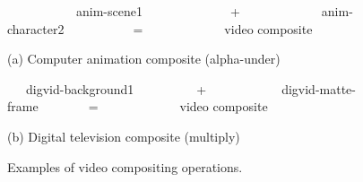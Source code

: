 \begin{figure}[t]
\centering
\begin{minipage}{0.3\textwidth}
\centering
{}
\vspace{2pt}
\end{minipage}
\begin{minipage}{0.3\textwidth}
\centering
{}
\vspace{2pt}
\end{minipage}
\begin{minipage}{0.3\textwidth}
\centering
{}
\vspace{2pt}
\end{minipage}

{\small ~~~~~~~~~~~anim-scene1~~~~~~~~~~~~~~+~~~~~~~~~~~~~anim-character2~~~~~~~~~~~=~~~~~~~~~~~~~video composite~~~~~~~}

\begin{center}
\vspace{-3pt}
(a) Computer animation composite (alpha-under)
\end{center} \vspace{12pt}

\begin{minipage}{0.3\textwidth}
\centering
{}
\vspace{2pt}
\end{minipage}
\begin{minipage}{0.3\textwidth}
\centering
{}
\vspace{2pt}
\end{minipage}
\begin{minipage}{0.3\textwidth}
\centering
{}
\vspace{2pt}
\end{minipage}

{\small ~~~digvid-background1~~~~~~~~~~+~~~~~~~~~~~~digvid-matte-frame~~~~~~~~=~~~~~~~~~~~~~video composite~~~~~~~}

\begin{center}
\vspace{-3pt}
(b) Digital television composite (multiply)
\end{center}
\vspace{-3pt}
\caption{Examples of video compositing operations.\protect\label{fig:videos}}
\end{figure}

